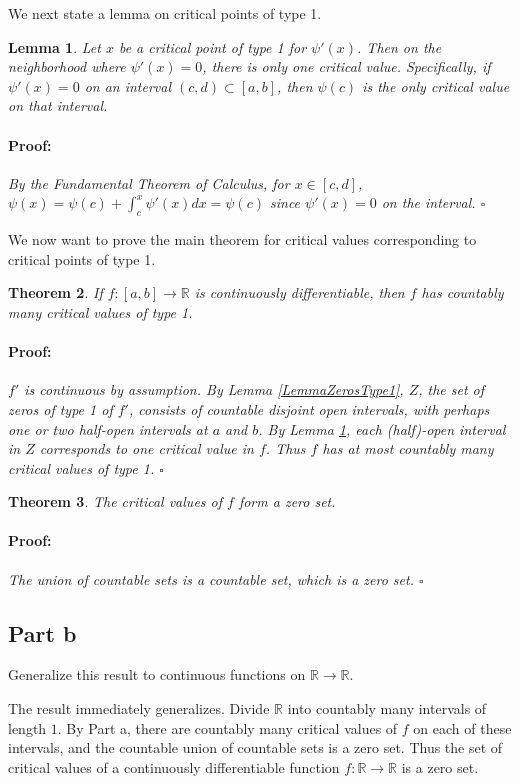 \documentclass{article}
\newenvironment{proof}{\paragraph{Proof:}}{\hfill$\square$}
\newtheorem{theorem}{Theorem}
\newtheorem{lemma}[theorem]{Lemma}
\newcommand{\R}{\mathbb{R}}
\begin{document}
We next state a lemma on critical points of type 1.

\begin{lemma}
\label{LemmaCriticalValuesType1}
Let $x$ be a critical point of type 1 for $\psi'(x)$. Then on the neighborhood where $\psi'(x) = 0$, there is only one critical value. Specifically, if $\psi'(x) = 0$ on an interval $(c, d) \subset [a, b]$, then $\psi(c)$ is the only critical value on that interval.
\begin{proof}
By the Fundamental Theorem of Calculus, for $x \in [c, d]$, $\psi(x) = \psi(c) + \int_c^x \psi'(x) dx = \psi(c)$ since $\psi'(x) = 0$ on the interval. 
\end{proof}
\end{lemma}

We now want to prove the main theorem for critical values corresponding to critical points of type 1.

\begin{theorem}
If $f: [a, b] \rightarrow \R$ is continuously differentiable, then $f$ has countably many critical values of type 1.
\begin{proof}
$f'$ is continuous by assumption. By Lemma \ref{LemmaZerosType1}, $Z$, the set of zeros of type 1 of $f'$, consists of countable disjoint open intervals, with perhaps one or two half-open intervals at $a$ and $b$. By Lemma \ref{LemmaCriticalValuesType1}, each (half)-open interval in $Z$ corresponds to one critical value in $f$. Thus $f$ has at most countably many critical values of type 1.
\end{proof}
\end{theorem}

\begin{theorem}
The critical values of $f$ form a zero set.
\begin{proof}
The union of countable sets is a countable set, which is a zero set.
\end{proof}
\end{theorem}

\subsection*{Part b}

Generalize this result to continuous functions on $\R \rightarrow \R$.

The result immediately generalizes. Divide $\R$ into countably many intervals of length $1$. By Part a, there are countably many critical values of $f$ on each of these intervals, and the countable union of countable sets is a zero set. Thus the set of critical values of a continuously differentiable function $f: \R \rightarrow \R$ is a zero set. 
\end{document}
